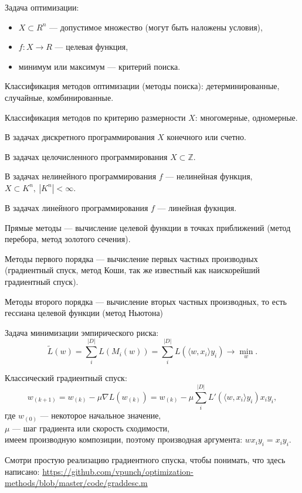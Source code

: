 Задача оптимизации:
\begin{itemize}
    \item $X \subset R^n$ --- допустимое множество (могут быть наложены
        условия),

    \item $f : X \to R$ --- целевая функция,

    \item минимум или максимум --- критерий поиска.
\end{itemize}

Классификация методов оптимизации (методы поиска): детерминированные,
случайные, комбинированные.

Классификация методов по критерию размерности $X$: многомерные, одномерные.

В задачах дискретного программирования $X$ конечного или счетно.

В задачах целочисленного программирования $X \subset \mathbb{Z}$.

В задачах нелинейного программирования $f$ --- нелинейная функция, $X \subset
K^n,\ |K^n| < \infty$.

В задачах линейного программирования $f$ --- линейная фукнция.

Прямые методы --- вычисление целевой функции в точках приближений (метод
перебора, метод золотого сечения).

Методы первого порядка --- вычисление первых частных производных (градиентный
спуск, метод Коши, так же известный как наискорейший градиентный спуск).

Методы второго порядка --- вычисление вторых частных производных, то есть
гессиана целевой функции (метод Ньютона)

Задача минимизации эмпирического риска:
\[
    \tilde L(w) = \sum_i^{|D|} L(M_i(w)) = \sum^{|D|}_i L( \langle w, x_i
    \rangle y_i) \to \min_w.
\]

Классический градиентный спуск:
\[
    w_{(k+1)} = w_{(k)} - \mu \nabla L(w_{(k)}) = w_{(k)} - \mu \sum_i^{|D|} L'(\langle w, x_i \rangle y_i ) x_i
    y_i,
\]
где $w_{(0)}$ --- некоторое начальное значение,\\
$\mu$ --- шаг градиента или скорость сходимости,\\
имеем производную композиции, поэтому производная аргумента: $wx_iy_i = x_iy_i$.

Смотри простую реализацию градиентного спуска, чтобы понимать, что здесь
написано: \url{https://github.com/vpunch/optimization-methods/blob/master/code/graddesc.m}

